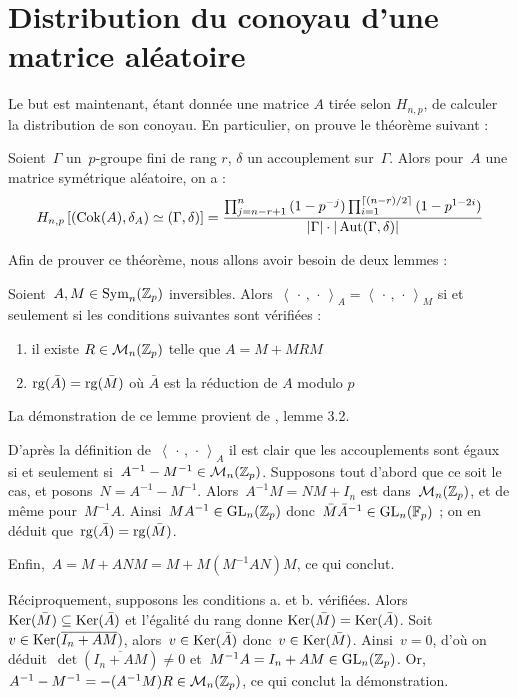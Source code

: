 \section{Distribution du conoyau d'une matrice aléatoire}

Le but est maintenant, étant donnée une matrice $A$ tirée selon $H_{n,p}$, de calculer la distribution de son conoyau.
En particulier, on prouve le théorème suivant :

\begin{thm}
Soient~$\Gamma$ un~$p$-groupe fini de rang $r$, $\delta$ un accouplement sur~$\Gamma$.
Alors pour~$A$ une matrice symétrique aléatoire, on a :
\[ H_{n,p}\left[(\operatorname{Cok}(A),\delta_A) \simeq (\Gamma,\delta)\right] = \frac{\prod_{j=n-r+1}^{n}{(1-p^{-j})}\prod_{i=1}^{\lceil (n-r)/2\rceil}{(1-p^{1-2i})}}{|\Gamma|\cdot|\operatorname{Aut}(\Gamma,\delta)|}\]
\end{thm} 

Afin de prouver ce théorème, nous allons avoir besoin de deux lemmes :

\begin{lem}
Soient~$A,M\in\operatorname{Sym}_n(\mathbb{Z}_p)$ inversibles. Alors~$\left<\,\cdot\,,\,\cdot\,\right>_{\!A} = \left<\,\cdot\,,\,\cdot\,\right>_{\!M}$ si et seulement si les conditions suivantes sont vérifiées :
\begin{enumerate}
\item il existe $R\in\mathcal M_n(\mathbb{Z}_p)$ telle que $A=M+MRM$
\item $\operatorname{rg}(\bar A) = \operatorname{rg}(\bar M)$ où $\bar A$ est la réduction de $A$ modulo $p$
\end{enumerate}
\end{lem}

La démonstration de ce lemme provient de \cite{lemma}, lemme 3.2.
\begin{dem}
D'après la définition de~$\left<\,\cdot\,,\,\cdot\,\right>_{\!A}$ il est clair que les accouplements sont égaux si et seulement si~$A^{-1} - M^{-1} \in \mathcal{M}_n(\mathbb{Z}_p)$.
Supposons tout d'abord que ce soit le cas, et posons~$N = A^{-1} - M^{-1}$. Alors~$A^{-1}M = NM+I_n$ est dans~$\mathcal M_n(\mathbb{Z}_p)$, et de même pour~$M^{-1}A$. 
Ainsi~$MA^{-1}\in \operatorname{GL}_n(\mathbb{Z}_p)$ donc~$\bar M\bar A^{-1}\in \operatorname{GL}_n(\mathbb F_p)$ ; on en déduit que~$\operatorname{rg}(\bar A) = \operatorname{rg}(\bar M)$.

Enfin,~$A = M+ANM = M + M(M^{-1}AN)M$, ce qui conclut.

Réciproquement, supposons les conditions a. et b. vérifiées. Alors~$\operatorname{Ker}(\bar M) \subseteq \operatorname{Ker}(\bar A)$ et l'égalité du rang donne $\operatorname{Ker}(\bar M) = \operatorname{Ker}(\bar A)$.
Soit~$v\in\operatorname{Ker}(\overline{I_n+AM})$, alors~$v\in\operatorname{Ker}(\bar A)$ donc~$v\in\operatorname{Ker}(\bar M)$. Ainsi~$v = 0$, d'où on déduit~$\det(\overline{I_n+AM})\neq 0$ et~$M^{-1}A = I_n+AM \in\operatorname{GL}_n(\mathbb{Z}_p)$.
Or, $A^{-1}-M^{-1} = -(A^{-1}M)R \in\mathcal M_n(\mathbb{Z}_p)$,  ce qui conclut la démonstration.
\end{dem}

